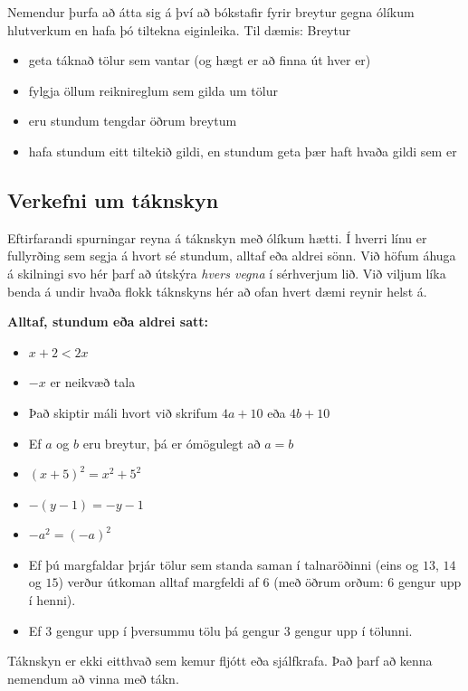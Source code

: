 \documentclass[
  icelandic,
]{book}
\providecommand{\tightlist}{%
  \setlength{\itemsep}{0pt}\setlength{\parskip}{0pt}}
\theoremstyle{definition}
\theoremstyle{definition}
\theoremstyle{definition}
\theoremstyle{definition}
\theoremstyle{remark}
\begin{document}
Nemendur þurfa að átta sig á því að bókstafir fyrir breytur gegna ólíkum hlutverkum en hafa þó tiltekna eiginleika. Til dæmis: Breytur

\begin{itemize}
\tightlist
\item
  geta táknað tölur sem vantar (og hægt er að finna út hver er)
\item
  fylgja öllum reiknireglum sem gilda um tölur
\item
  eru stundum tengdar öðrum breytum
\item
  hafa stundum eitt tiltekið gildi, en stundum geta þær haft hvaða gildi sem er
\end{itemize}

\subsection{Verkefni um táknskyn}\label{verkefni-taknskyn}

Eftirfarandi spurningar reyna á táknskyn með ólíkum hætti. Í hverri línu er fullyrðing sem segja á hvort sé stundum, alltaf eða aldrei sönn. Við höfum áhuga á skilningi svo hér þarf að útskýra \emph{hvers vegna} í sérhverjum lið. Við viljum líka benda á undir hvaða flokk táknskyns hér að ofan hvert dæmi reynir helst á.

\textbf{Alltaf, stundum eða aldrei satt:}

\begin{itemize}
\tightlist
\item
  \(x+2 < 2x\)
\item
  \(-x\) er neikvæð tala
\item
  Það skiptir máli hvort við skrifum \(4a+10\) eða \(4b+10\)
\item
  Ef \(a\) og \(b\) eru breytur, þá er ómögulegt að \(a=b\)
\item
  \((x+5)^2 = x^2 + 5^2\)
\item
  \(-(y-1) = -y -1\)
\item
  \(-a^2 = (-a)^2\)
\item
  Ef þú margfaldar þrjár tölur sem standa saman í talnaröðinni (eins og \(13\), \(14\) og \(15\)) verður útkoman alltaf margfeldi af \(6\) (með öðrum orðum: \(6\) gengur upp í henni).
\item
  Ef \(3\) gengur upp í þversummu tölu þá gengur \(3\) gengur upp í tölunni.
\end{itemize}

Táknskyn er ekki eitthvað sem kemur fljótt eða sjálfkrafa. Það þarf að kenna nemendum að vinna með tákn.
\end{document}
